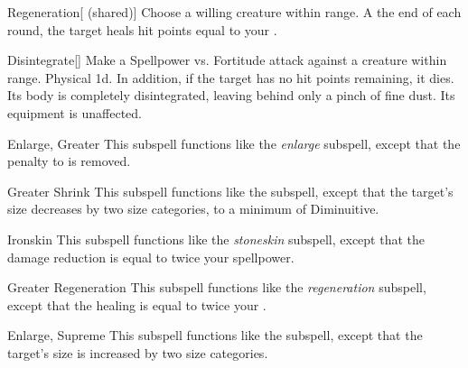 \begin{ability}[\nth{4}]{Regeneration}[ (shared)]
Choose a willing creature within \rngclose range.
A the end of each round, the target heals hit points equal to your .
\end{ability}
\vspace{0.25em}


\begin{ability}[\nth{6}]{Disintegrate}[]
Make a Spellpower vs. Fortitude attack against a creature within \rngmed range.
\hit Physical  \plus1d.
In addition, if the target has no hit points remaining, it dies.
Its body is completely disintegrated, leaving behind only a pinch of fine dust.
Its equipment is unaffected.
\end{ability}
\vspace{0.25em}


\begin{ability}[\nth{6}]{Enlarge, Greater}
This subspell functions like the \textit{enlarge} subspell, except that the penalty to  is removed.
\end{ability}
\vspace{0.25em}


\begin{ability}[\nth{6}]{Greater Shrink}
This subspell functions like the  subspell, except that the target's size decreases by two size categories, to a minimum of Diminuitive.
\end{ability}
\vspace{0.25em}


\begin{ability}[\nth{7}]{Ironskin}
This subspell functions like the \textit{stoneskin} subspell, except that the damage reduction is equal to twice your spellpower.
\end{ability}
\vspace{0.25em}


\begin{ability}[\nth{8}]{Greater Regeneration}
This subspell functions like the \textit{regeneration} subspell, except that the healing is equal to twice your .
\end{ability}
\vspace{0.25em}


\begin{ability}[\nth{9}]{Enlarge, Supreme}
This subspell functions like the  subspell, except that the target's size is increased by two size categories.
\end{ability}
\vspace{0.25em}

